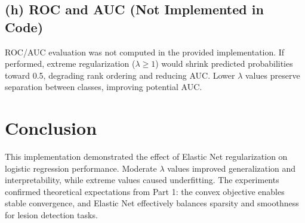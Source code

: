 \documentclass[12pt]{article}
\begin{document}
\subsection{(h) ROC and AUC (Not Implemented in Code)}
ROC/AUC evaluation was not computed in the provided implementation. If performed, extreme regularization ($\lambda\ge1$) would shrink predicted probabilities toward 0.5, degrading rank ordering and reducing AUC. Lower $\lambda$ values preserve separation between classes, improving potential AUC.

\section{Conclusion}
This implementation demonstrated the effect of Elastic Net regularization on logistic regression performance.  
Moderate $\lambda$ values improved generalization and interpretability, while extreme values caused underfitting.  
The experiments confirmed theoretical expectations from Part 1: the convex objective enables stable convergence, and Elastic Net effectively balances sparsity and smoothness for lesion detection tasks.
\end{document}
